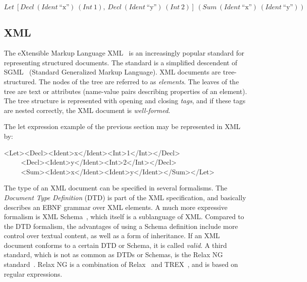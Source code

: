 \begin{small}
$Let~[Decl~(Ident~\text{``x''})~(Int~1),~Decl~(Ident~\text{``y''})~(Int~2)]~(Sum~(Ident~\text{``x''})~(Ident~\text{``y''}))$
\end{small}

\subsection{XML}


The eXtensible Markup Language XML~\cite{xml11} is an increasingly popular standard for representing structured documents. The standard is a simplified descendent of SGML~\cite{sgml86} (Standard Generalized Markup Language). XML documents are tree-structured. The nodes of the tree are referred to as {\em elements}. The leaves of the tree are text or attributes (name-value pairs describing properties of an element). The tree structure is represented with opening and closing {\em tags}, and if these tags are nested correctly, the XML document is {\em well-formed}.

The let expression example of the previous section may be represented in XML by:

\ttfamily\begin{small}\begin{tabbing}
<Let><Decl><Ident>x</Ident><Int>1</Int></Decl>\\
~~~~~<Decl><Ident>y</Ident><Int>2</Int></Decl>\\
~~~~~<Sum><Ident>x</Ident><Ident>y</Ident></Sum></Let>
\end{tabbing}\end{small}\rmfamily


The type of an XML document can be specified in several formalisms. The {\em Document Type Definition} (DTD) is part of the XML specification, and basically describes an EBNF grammar over XML elements. A much more expressive formalism is XML Schema~\cite{xmlSchema1}, which itself is a sublanguage of XML. Compared to the DTD formalism, the advantages of using a Schema definition include more control over textual content, as well as a form of inheritance. If an XML document conforms to a certain DTD or Schema, it is called {\em valid}. A third standard, which is not as common as DTDs or Schemas, is the Relax NG standard~\cite{relaxNG01}. Relax NG is a combination of Relax~\cite{relax01} and TREX~\cite{trex01}, and is based on regular expressions. 


